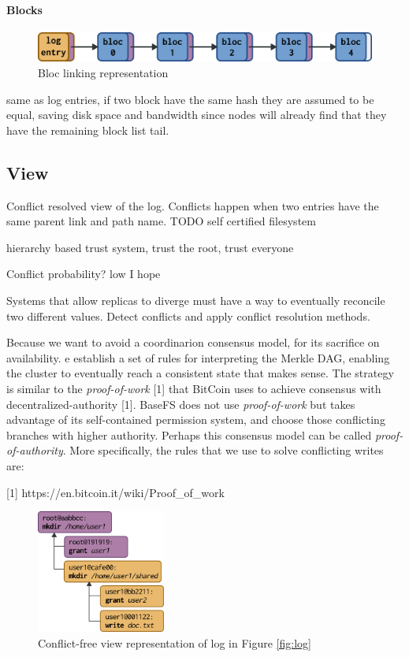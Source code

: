 \documentclass{sig-alternate}
\begin{document}
\paragraph{Blocks}

\begin{figure}[htp]
\centering
\includegraphics[width=\columnwidth]{imgs/blocs.png}
\caption{Bloc linking representation}
\label{fig:blocs}
\end{figure}


same as log entries, if two block have the same hash they are assumed to be equal, saving disk space and bandwidth since nodes will already find that they have the remaining block list tail.


\subsection{View} \label{view}


Conflict resolved view of the log. Conflicts happen when two entries have the same parent link and path name.
 TODO self certified filesystem

 hierarchy based trust system, trust the root, trust everyone
 
Conflict probability? low I hope

Systems that allow replicas to diverge must have a way to eventually reconcile two different values. Detect conflicts and apply conflict resolution methods.

Because we want to avoid a coordinarion consensus model, for its sacrifice on availability. e establish a set of rules for interpreting the Merkle DAG, enabling the cluster to eventually reach a consistent state that makes sense. The strategy is similar to the \textit{proof-of-work} [1] that BitCoin uses to achieve consensus with decentralized-authority [1]. BaseFS does not use \textit{proof-of-work} but takes advantage of its self-contained permission system, and choose those conflicting branches with higher authority. Perhaps this consensus model can be called \textit{proof-of-authority}. More specifically, the rules that we use to solve conflicting writes are:

[1] https://en.bitcoin.it/wiki/Proof\_of\_work

\begin{figure}[htp]
\centering
\includegraphics[width=120pt]{imgs/view.png}
\caption{Conflict-free view representation of log in Figure \ref{fig:log}}
\label{fig:view}
\end{figure}
\end{document}
